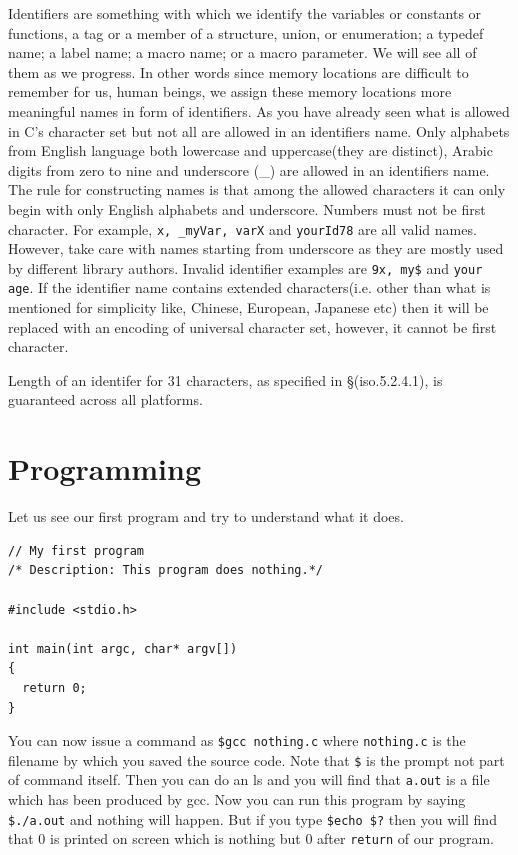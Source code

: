 Identifiers are something  with which we identify the variables or constants or
functions, a tag or a member of a structure, union, or
enumeration; a typedef name; a label name; a macro name; or a macro
parameter. We will see all of them as we progress. In other words 
since memory locations are difficult to remember for us, human beings, we
assign these memory locations more meaningful names in form of identifiers. As
you have already seen what is allowed  in C's character set but not all are
allowed in an identifiers name. Only alphabets from English language both
lowercase and uppercase(they are distinct),
Arabic digits from zero to nine and underscore (\_) are allowed in an
identifiers name. The rule for constructing names is that among the allowed
characters it can only begin with only English alphabets and
underscore. Numbers must not be first character. For example, \texttt{x,
  \_myVar, varX} and \texttt{yourId78} are all valid names. However, take care
with names starting from underscore as they are mostly used by different
library authors. Invalid identifier examples are \texttt{9x, my\$} and
\texttt{your age}. If the identifier name contains extended
characters(i.e. other than what is mentioned for simplicity like, Chinese,
European, Japanese etc) then it will be replaced with an encoding of universal
character set, however, it cannot be first character.

Length of an identifer for 31 characters, as specified in \S(iso.5.2.4.1), is
guaranteed across all platforms.

\section{Programming}
Let us see our first program and try to understand what it does.

\begin{Verbatim}[frame=single]
// My first program
/* Description: This program does nothing.*/

#include <stdio.h>

int main(int argc, char* argv[])
{
  return 0;
}
\end{Verbatim}

You can now issue a command as \texttt{\$gcc nothing.c} where 
\texttt{nothing.c} is the filename by which you saved the source code. Note 
that \texttt{\$} is the prompt not part of command itself. Then you can do an 
ls and you will find that \texttt{a.out} is a file which has been produced by 
gcc. Now you can run this program by saying \texttt{\$./a.out} and nothing 
will happen. But if you type \texttt{\$echo \$?} then you will find that 0 is 
printed on screen which is nothing but 0 after \texttt{return} of our program.

